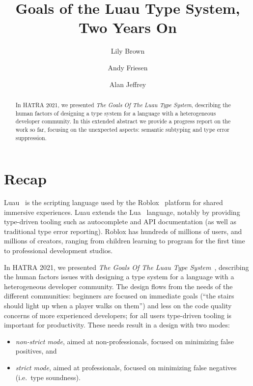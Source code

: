 \documentclass[acmsmall]{acmart}
\begin{document}
\title{Goals of the Luau Type System, Two Years On}

\author{Lily Brown}
\author{Andy Friesen}
\author{Alan Jeffrey}

\begin{abstract}
In HATRA 2021, we presented \emph{The Goals Of The Luau Type System},
describing the human factors of designing a type system for a
language with a heterogeneous developer community. In this extended
abstract we provide a progress report on the work so far, focusing on
the unexpected aspects: semantic subtyping and type error
suppression.
\end{abstract}

\maketitle

\section{Recap}

Luau~\cite{Luau} is the scripting language used by the
Roblox~\cite{Roblox} platform for shared immersive experiences.  Luau extends
the Lua~\cite{Lua} language, notably by providing type-driven tooling
such as autocomplete and API documentation (as well as traditional type
error reporting). Roblox has hundreds of millions of users, and
millions of creators, ranging from children learning to program for
the first time to professional development studios.

In HATRA 2021, we presented \emph{The Goals Of The Luau Type
System}~\cite{BFJ21:GoalsLuau}, describing the human factors issues
with designing a type system for a language with a heterogeneous
developer community. The design flows from the needs of the different
communities: beginners are focused on immediate goals (``the stairs
should light up when a player walks on them'') and less on the code
quality concerns of more experienced developers; for all users
type-driven tooling is important for productivity. These needs result in a design with two modes:
\begin{itemize}
\item \emph{non-strict mode}, aimed at non-professionals, focused on
  minimizing false positives, and
\item \emph{strict mode}, aimed at professionals, focused on
  minimizing false negatives (i.e.~type soundness).
\end{itemize}
\end{document}
